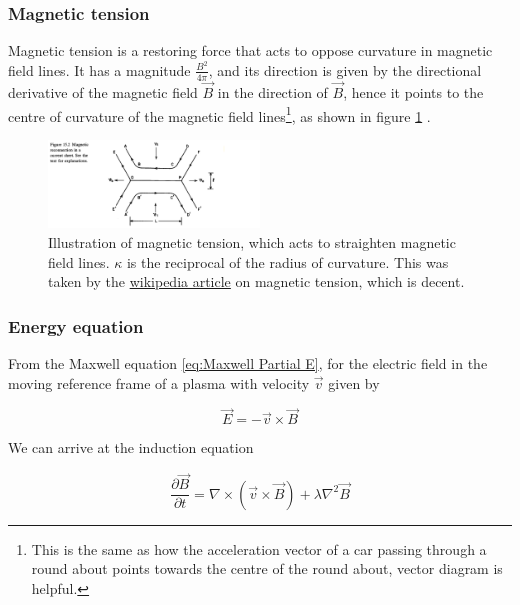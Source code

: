\subsubsection{Magnetic tension}

Magnetic tension is a restoring force that acts to oppose curvature in magnetic field lines. It has a magnitude $\frac{B^2}{4\pi}$, and its direction is given by the directional derivative of the magnetic field $\Vec{B}$ in the direction of $\Vec{B}$, hence it points to the centre of curvature of the magnetic field lines\footnote{This is the same as how the acceleration vector of a car passing through a round about points towards the centre of the round about, vector diagram is helpful.}, as shown in figure \ref{fig:Magnetic tension} .

\begin{figure}
    \centering
    \includegraphics[width=0.5\textwidth]{preliminaries/preliminaries_images/magnetic_reconnection.png}
    \caption{Illustration of magnetic tension, which acts to straighten magnetic field lines. $\kappa$ is the reciprocal of the radius of curvature. This was taken by the \href{https://en.wikipedia.org/wiki/Magnetic_tension}{wikipedia article} on magnetic tension, which is decent.}
    \label{fig:Magnetic tension}
\end{figure}

\subsubsection{Energy equation}
From the Maxwell equation \ref{eq:Maxwell Partial E}, for the electric field in the moving reference frame of a plasma with velocity $\Vec{v}$ given by 

\begin{equation}\label{eq:Electric field in moving frame}
    \Vec{E} = -\Vec{v} \times \Vec{B}
\end{equation}

We can arrive at the induction equation

\begin{equation}\label{eq:Induction equation}
    \frac{\partial \Vec{B}}{\partial t} = \nabla \times (\Vec{v} \times \Vec{B}) + \lambda \nabla^2 \Vec{B}
\end{equation}

